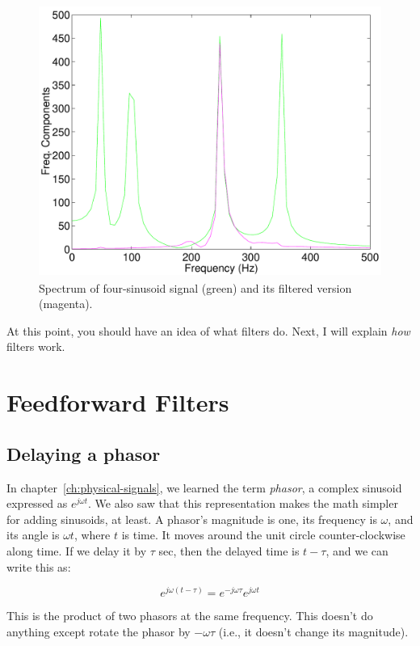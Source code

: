 \begin{figure}
\centerline{\includegraphics[height=3.5in]{ch-fir/sine4_sp}}
\caption[Unfiltered vs. filtered signal]{Spectrum of four-sinusoid
signal (green) and its filtered version
(magenta).\label{fig:sine4-sp}}
\end{figure}

At this point, you should have an idea of what filters do. Next, I
will explain \emph{how} filters work.

\section{Feedforward Filters}

\subsection{Delaying a phasor}

In chapter~\ref{ch:physical-signals}, we learned the term
\emph{phasor}, a complex sinusoid expressed as $e^{j\omega t}$.  We
also saw that this representation makes the math simpler for adding
sinusoids, at least.  A phasor's magnitude is one, its frequency is
$\omega$, and its angle is $\omega t$, where $t$ is time. It moves
around the unit circle counter-clockwise along time.  If we delay it
by $\tau$ sec, then the delayed time is $t-\tau$, and we can write
this as:

\begin{equation}
e^{j\omega (t-\tau)} = e^{-j\omega \tau} e^{j\omega t}
\end{equation}

This is the product of two phasors at the same frequency.
This doesn't do anything except rotate the phasor by $-\omega \tau$
(i.e., it doesn't change its magnitude).

